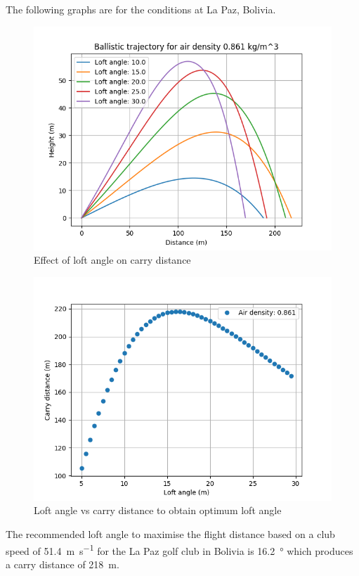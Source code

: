 \documentclass[12pt]{article}
\begin{document}
The following graphs are for the conditions at La Paz, Bolivia.

\begin{figure}[H]
\centering
\caption{Effect of loft angle on carry distance}
\includegraphics[scale=0.6]{results0861}
\end{figure}

\begin{figure}[H]
\centering
\caption{Loft angle vs carry distance to obtain optimum loft angle}
\includegraphics[scale=0.6]{results0861range}
\end{figure}

The recommended loft angle to maximise the flight distance based on a club speed of \SI{51.4}{\metre\per\second} for the La Paz golf club in Bolivia is \SI{16.2}{\degree} which produces a carry distance of \SI{218}{\metre}.
 
\end{document}
